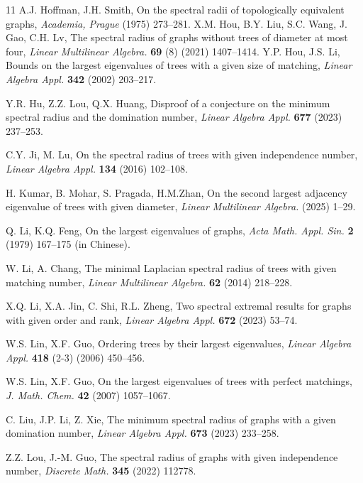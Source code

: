 \documentclass[12pt]{amsart}
\begin{document}
\begin{thebibliography}{11}
A.J. Hoffman, J.H. Smith, 
On the spectral radii of topologically equivalent graphs, 
\emph{Academia, Prague}
(1975) 273--281. 
X.M. Hou, B.Y. Liu, S.C. Wang, J. Gao, C.H. Lv,
The spectral radius of graphs without trees of diameter at most four,
\emph{Linear Multilinear Algebra.}
\textbf{69} (8) (2021) 1407--1414. 
Y.P. Hou, J.S. Li, 
Bounds on the largest eigenvalues of trees with a given size of matching, 
\emph{Linear Algebra Appl.} 
\textbf{342} (2002)  203--217.


Y.R. Hu, Z.Z. Lou, Q.X. Huang,
Disproof of a conjecture on the minimum spectral radius and the domination number,
\emph{Linear Algebra Appl.} 
\textbf{677} (2023) 237--253. 

C.Y. Ji, M. Lu, 
On the spectral radius of trees with given independence number, 
\emph{Linear Algebra Appl.} 
\textbf{134} (2016) 102--108.

H. Kumar, B. Mohar, S. Pragada, H.M.Zhan,
On the second largest adjacency eigenvalue of trees with given diameter,
\emph{Linear Multilinear Algebra.}
(2025) 1--29. 

Q. Li, K.Q. Feng, 
On the largest eigenvalues of graphs, 
\emph{Acta Math. Appl. Sin.}
\textbf{2} (1979) 167--175 (in Chinese).

W. Li, A. Chang, 
The minimal Laplacian spectral radius of trees with given matching number, 
\emph{Linear Multilinear Algebra.} 
\textbf{62} (2014)  218--228.

X.Q. Li, X.A. Jin, C. Shi, R.L. Zheng, 
Two spectral extremal results for graphs with given order and rank, 
\emph{Linear Algebra Appl.}
\textbf{672} (2023)  53--74. 

W.S. Lin, X.F. Guo,
Ordering trees by their largest eigenvalues,
\emph{Linear Algebra Appl.}
\textbf{418} (2-3) (2006)  450--456. 

W.S. Lin, X.F. Guo, 
On the largest eigenvalues of trees with perfect matchings, 
\emph{J. Math. Chem.} 
\textbf{42} (2007)  1057--1067.

C. Liu, J.P. Li, Z. Xie, 
The minimum spectral radius of graphs with a given domination number, 
\emph{Linear Algebra Appl.}
\textbf{673} (2023)  233--258.

Z.Z. Lou,  J.-M. Guo, 
The spectral radius of graphs with given independence number, 
\emph{Discrete Math.}
\textbf{345} (2022)  112778. 


\end{thebibliography}
\end{document}
